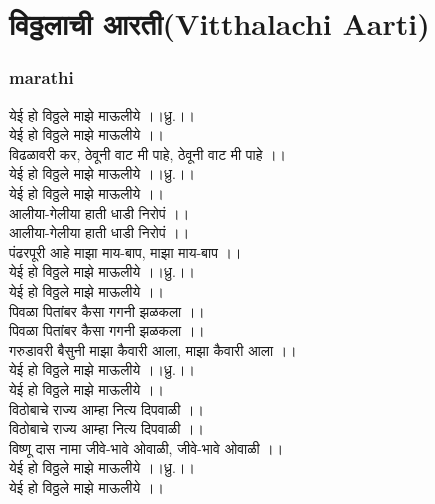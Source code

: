 \documentclass[letterpaper,twocolumn,openany,nodeprecatedcode]{dndbook}
\begin{document}
\chapter{विठ्ठलाची आरती(Vitthalachi Aarti)}
\begin{flushleft}
  \subsection*{marathi}
  येई हो विठ्ठले माझे माऊलीये ।।ध्रु.।।\\
  येई हो विठ्ठले माझे माऊलीये ।।\\
  विढळावरी कर, ठेवूनी वाट मी पाहे, ठेवूनी वाट मी पाहे ।।\\
  येई हो विठ्ठले माझे माऊलीये ।।ध्रु.।।\\
  येई हो विठ्ठले माझे माऊलीये ।।\\
  आलीया-गेलीया हाती धाडी निरोपं ।।\\
  आलीया-गेलीया हाती धाडी निरोपं ।।\\
  पंढरपूरी आहे माझा माय-बाप, माझा माय-बाप ।।\\
  येई हो विठ्ठले माझे माऊलीये ।।ध्रु.।।\\
  येई हो विठ्ठले माझे माऊलीये ।।\\
  पिवळा पितांबर कैसा गगनी झळकला ।।\\
  पिवळा पितांबर कैसा गगनी झळकला ।।\\
  गरुडावरी बैसुनी माझा कैवारी आला, माझा कैवारी आला ।।\\
  येई हो विठ्ठले माझे माऊलीये ।।ध्रु.।।\\
  येई हो विठ्ठले माझे माऊलीये ।।\\
  विठोबाचे राज्य आम्हा नित्य दिपवाळी ।।\\
  विठोबाचे राज्य आम्हा नित्य दिपवाळी ।।\\
  विष्णू दास नामा जीवे-भावे ओवाळी, जीवे-भावे ओवाळी ।।\\
  येई हो विठ्ठले माझे माऊलीये ।।ध्रु.।।\\
  येई हो विठ्ठले माझे माऊलीये ।।\\
  \pagebreak

\end{flushleft}
\end{document}
